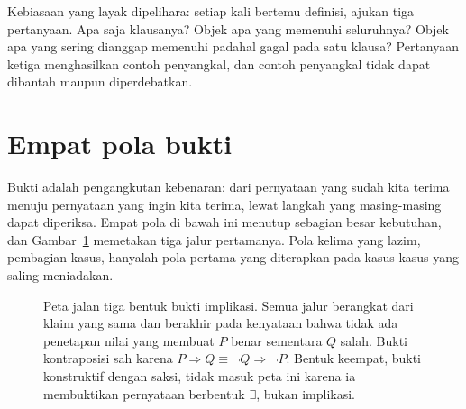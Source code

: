 Kebiasaan yang layak dipelihara: setiap kali bertemu
definisi, ajukan tiga pertanyaan. Apa saja klausanya? Objek apa yang memenuhi
seluruhnya? Objek apa yang sering dianggap memenuhi padahal gagal pada satu klausa?
Pertanyaan ketiga menghasilkan contoh penyangkal, dan contoh penyangkal tidak dapat
dibantah maupun diperdebatkan.

\section{Empat pola bukti}

Bukti adalah pengangkutan kebenaran: dari pernyataan yang sudah kita terima menuju
pernyataan yang ingin kita terima, lewat langkah yang masing-masing dapat diperiksa.
Empat pola di bawah ini menutup sebagian besar kebutuhan, dan
Gambar~\ref{fig:peta-tiga-bukti} memetakan tiga jalur pertamanya. Pola kelima yang lazim,
pembagian kasus, hanyalah pola pertama yang diterapkan pada kasus-kasus yang saling
meniadakan.

\begin{figure}[htbp]
\centering
{}
\caption{Peta jalan tiga bentuk bukti implikasi. Semua jalur berangkat dari klaim yang sama
dan berakhir pada kenyataan bahwa tidak ada penetapan nilai yang membuat $P$ benar sementara
$Q$ salah. Bukti kontraposisi sah karena $P \Rightarrow Q \equiv \neg Q \Rightarrow \neg P$.
Bentuk keempat, bukti konstruktif dengan saksi, tidak masuk peta ini karena ia membuktikan
pernyataan berbentuk $\exists$, bukan implikasi.}
\label{fig:peta-tiga-bukti}
\end{figure}

